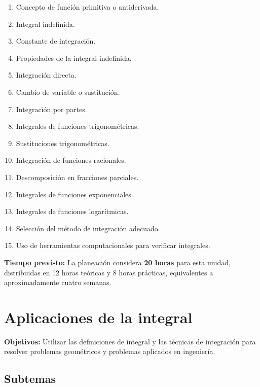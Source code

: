 \documentclass[12pt]{article}
\begin{document}
\begin{enumerate}
    \item Concepto de función primitiva o antiderivada.
    \item Integral indefinida.
    \item Constante de integración.
    \item Propiedades de la integral indefinida.
    \item Integración directa.
    \item Cambio de variable o sustitución.
    \item Integración por partes.
    \item Integrales de funciones trigonométricas.
    \item Sustituciones trigonométricas.
    \item Integración de funciones racionales.
    \item Descomposición en fracciones parciales.
    \item Integrales de funciones exponenciales.
    \item Integrales de funciones logarítmicas.
    \item Selección del método de integración adecuado.
    \item Uso de herramientas computacionales para verificar integrales.
\end{enumerate}

\textbf{Tiempo previsto:} La planeación considera \textbf{20 horas} para esta unidad, distribuidas en 12 horas teóricas y 8 horas prácticas, equivalentes a aproximadamente cuatro semanas.

\section{Aplicaciones de la integral}

\textbf{Objetivos:} Utilizar las definiciones de integral y las técnicas de integración para resolver problemas geométricos y problemas aplicados en ingeniería.

\subsection{Subtemas}
\end{document}
